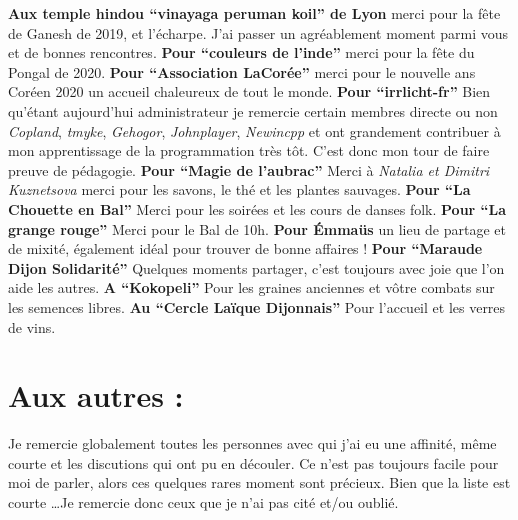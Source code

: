 \documentclass[../thesis.tex]{subfiles}
\begin{document}
\textbf{Aux temple hindou ``vinayaga peruman koil'' de Lyon} merci pour la fête de Ganesh de 2019, et l'écharpe.
J'ai passer un agréablement moment parmi vous et de bonnes rencontres.
\textbf{Pour ``couleurs de l'inde''} merci pour la fête du Pongal de 2020.
\textbf{Pour ``Association LaCorée''} merci pour le nouvelle ans Coréen 2020 un accueil chaleureux de tout le monde.
\textbf{Pour ``irrlicht-fr''} Bien qu'étant aujourd'hui administrateur je remercie certain membres directe ou non
\textit{Copland}, \textit{tmyke}, \textit{Gehogor}, \textit{Johnplayer}, \textit{Newincpp}
et ont grandement contribuer à mon apprentissage de la programmation très tôt.
C'est donc mon tour de faire preuve de pédagogie.
\textbf{Pour ``Magie de l'aubrac''} Merci à \textit{Natalia et Dimitri Kuznetsova} merci pour les savons, le thé et les plantes sauvages.
\textbf{Pour ``La Chouette en Bal''} Merci pour les soirées et les cours de danses folk.
\textbf{Pour ``La grange rouge''} Merci pour le Bal de 10h.
\textbf{Pour Émmaüs} un lieu de partage et de mixité, également idéal pour trouver de bonne affaires ! 
\textbf{Pour ``Maraude Dijon Solidarité''} Quelques moments partager, c'est toujours avec joie que l'on aide les autres.
\textbf{A ``Kokopeli''} Pour les graines anciennes et vôtre combats sur les semences libres.
\textbf{Au ``Cercle Laïque Dijonnais''} Pour l'accueil et les verres de vins.

\section*{Aux autres :}

\par Je remercie globalement toutes les personnes avec qui j'ai eu une affinité, même courte et les discutions qui ont pu en découler.
Ce n'est pas toujours facile pour moi de parler, alors ces quelques rares moment sont précieux.
Bien que la liste est courte \dots Je remercie donc ceux que je n'ai pas cité et/ou oublié.

\end{document}
